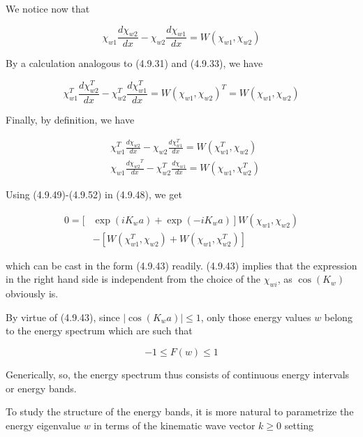 \documentclass{article}
\begin{document}
We notice now that
 
\begin{equation*}
\chi_{w 1} \frac{d \chi_{w 2}}{d x}-\chi_{w 2} \frac{d \chi_{w 1}}{d x}=W\left(\chi_{w 1}, \chi_{w 2}\right) \tag{4.9.49}
\end{equation*}
 

By a calculation analogous to (4.9.31) and (4.9.33), we have
 
\begin{equation*}
\chi_{w 1}^{T} \frac{d \chi_{w 2}^{T}}{d x}-\chi_{w 2}^{T} \frac{d \chi_{w 1}^{T}}{d x}=W\left(\chi_{w 1}, \chi_{w 2}\right)^{T}=W\left(\chi_{w 1}, \chi_{w 2}\right) \tag{4.9.50}
\end{equation*}
 

Finally, by definition, we have
 
\begin{align*}
& \chi_{w 1}^{T} \frac{d \chi_{w 2}}{d x}-\chi_{w 2} \frac{d \chi_{w 1}^{T}}{d x}=W\left(\chi_{w 1}^{T}, \chi_{w 2}\right)  \tag{4.9.51}\\
& \chi_{w 1} \frac{d \chi_{w 2}{ }^{T}}{d x}-\chi_{w 2}^{T} \frac{d \chi_{w 1}}{d x}=W\left(\chi_{w 1}, \chi_{w 2}^{T}\right) \tag{4.9.52}
\end{align*}
 

Using (4.9.49)-(4.9.52) in (4.9.48), we get
 
\begin{align*}
0=[ & \left.\exp \left(i K_{w} a\right)+\exp \left(-i K_{w} a\right)\right] W\left(\chi_{w 1}, \chi_{w 2}\right)  \tag{4.9.53}\\
& -\left[W\left(\chi_{w 1}^{T}, \chi_{w 2}\right)+W\left(\chi_{w 1}, \chi_{w 2}^{T}\right)\right]
\end{align*}
 
which can be cast in the form (4.9.43) readily. (4.9.43) implies that the expression in the right hand side is independent from the choice of the $\chi_{w i}$, as $\cos \left(K_{w}\right)$ obviously is.

By virtue of (4.9.43), since $\left|\cos \left(K_{w} a\right)\right| \leq 1$, only those energy values $w$ belong to the energy spectrum which are such that
 
\begin{equation*}
-1 \leq F(w) \leq 1 \tag{4.9.54}
\end{equation*}
 

Generically, so, the energy spectrum thus consists of continuous energy intervals or energy bands.

To study the structure of the energy bands, it is more natural to parametrize the energy eigenvalue $w$ in terms of the kinematic wave vector $k \geq 0$ setting
 
\end{document}
